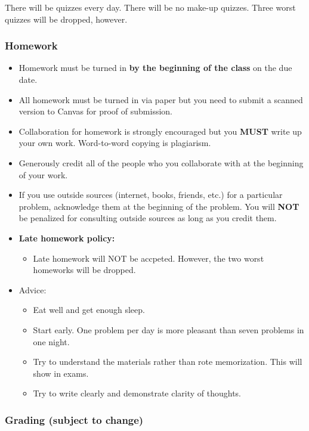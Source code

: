 \documentclass[
]{article}
\providecommand{\tightlist}{%
  \setlength{\itemsep}{0pt}\setlength{\parskip}{0pt}}
\begin{document}
There will be quizzes every day.
There will be no make-up quizzes.
Three worst quizzes will be dropped, however.

\subsubsection*{Homework}\label{homework}

\begin{itemize}
\tightlist
\item
  Homework must be turned in \textbf{by the beginning of the class} on the due date.
\item
  All homework must be turned in via paper but you need to submit a scanned version to Canvas for proof of submission.
\item
  Collaboration for homework is strongly encouraged but you \textbf{MUST} write up your own work. Word-to-word copying is plagiarism.
\item
  Generously credit all of the people who you collaborate with at the beginning of your work.
\item
  If you use outside sources (internet, books, friends, etc.) for a particular problem, acknowledge them at the beginning of the problem.
  You will \textbf{NOT} be penalized for consulting outside sources as long as you credit them.
\item
  \textbf{Late homework policy:}

  \begin{itemize}
  \tightlist
  \item
    Late homework will NOT be accpeted. However, the two worst homeworks will be dropped.
  \end{itemize}
\item
  Advice:

  \begin{itemize}
  \tightlist
  \item
    Eat well and get enough sleep.
  \item
    Start early. One problem per day is more pleasant than seven problems in one night.
  \item
    Try to understand the materials rather than rote memorization. This will show in exams.
  \item
    Try to write clearly and demonstrate clarity of thoughts.
  \end{itemize}
\end{itemize}

\subsubsection*{Grading (subject to change)}\label{grading-subject-to-change}
\end{document}
